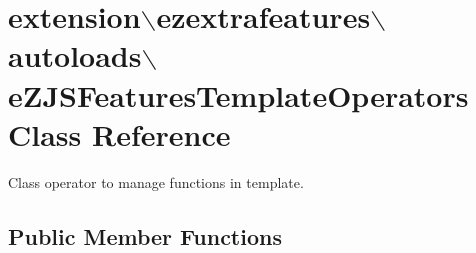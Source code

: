 \hypertarget{classextension_1_1ezextrafeatures_1_1autoloads_1_1e_z_j_s_features_template_operators}{\section{extension$\backslash$ezextrafeatures$\backslash$autoloads$\backslash$e\-Z\-J\-S\-Features\-Template\-Operators Class Reference}
\label{classextension_1_1ezextrafeatures_1_1autoloads_1_1e_z_j_s_features_template_operators}
}


Class operator to manage functions in template.  


\subsection*{Public Member Functions}
